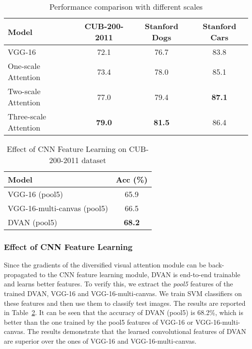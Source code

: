 \documentclass[journal]{IEEEtran}
\begin{document}
\begin{table}[!t]
  \centering
  \caption{Performance comparison with different scales}
  \label{tab:comparison_cub_1}
  \begin{tabular}{lccc}
    \hline\hline
    Model                            & CUB-200-2011 & Stanford Dogs & Stanford Cars\\
    \hline
    VGG-16                           & 72.1     & 76.7  & 83.8\\
    One-scale Attention              & 73.4     & 78.0  & 85.1\\
    Two-scale Attention              & 77.0     & 79.4  & \textbf{87.1}\\
    Three-scale Attention            & \textbf{79.0} & \textbf{81.5} & 86.4 \\
    \hline\hline
  \end{tabular}
  \vspace{-0.2in}
\end{table}

\begin{table}[!t]
  \centering
  \caption{Effect of CNN Feature Learning on CUB-200-2011 dataset}
  \vspace{-0.1in}
  \label{tab:pool5}
  \begin{tabular}{lc}
    \hline\hline
    Model                & Acc (\%)\\
    \hline
    VGG-16 (pool5)              & 65.9\\
    VGG-16-multi-canvas (pool5) & 66.5\\
    DVAN (pool5)                & \textbf{68.2}\\
    \hline\hline
  \end{tabular}
  \vspace{-0.2in}
\end{table}

\subsubsection{Effect of CNN Feature Learning} Since the gradients of the diversified visual attention module can be back-propagated to the CNN feature learning module, DVAN is end-to-end trainable and learns better features. To verify this, we extract the \textit{pool5} features of the trained DVAN, VGG-16 and VGG-16-multi-canvas. We train SVM classifiers on these features and then use them to classify test images. The results are reported in Table~\ref{tab:pool5}. It can be seen that the accuracy of DVAN (pool5) is 68.2\%, which is better than the one trained by the pool5 features of VGG-16 or VGG-16-multi-canvas. The results demonstrate that the learned convolutional features of DVAN are superior over the ones of VGG-16 and VGG-16-multi-canvas.
\end{document}
